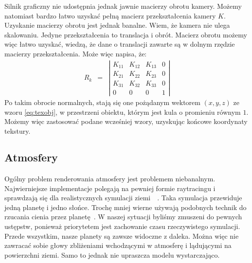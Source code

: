 Silnik graficzny nie udostępnia jednak jawnie macierzy obrotu kamery. Możemy natomiast bardzo łatwo uzyskać pełną macierz przekształcenia kamery $K$. Uzyskanie macierzy obrotu jest jednak banalne. Wiem, że kamera nie ulega skalowaniu. Jedyne przekształcenia to translacja i obrót. Macierz obrotu możemy więc łatwo uzyskać, wiedzą, że dane o translacji zawarte są w dolnym rzędzie macierzy przekształcenia. Może więc napisa, że:
\begin{eqnarray}
R_k &=&  
\left| \begin{array}{cccc}
K_{11} & K_{12} & K_{13} & 0 \\ 
K_{21} & K_{22} & K_{23} & 0 \\
K_{31} & K_{32} & K_{33} & 0 \\
0 & 0 & 0 & 1 
\end{array} \right|
\end{eqnarray}
Po takim obrocie normalnych, stają się one pożądanym wektorem $(x,y,z)$ ze wzoru \hyperref[eq:texobj]{\ref{eq:texobj}}, w przestrzeni obiektu, którym jest kula o promieniu równym $1$. Możemy więc zastosować podane wcześniej wzory, uzyskując końcowe koordynaty tekstury.

\subsection{Atmosfery}\label{sub:atmosfery}
\paragraph{}

Ogólny problem renderowania atmosfery jest problemem niebanalnym. Najwierniejsze implementacje polegają na pewniej formie raytracingu i sprawdzają się dla realistycznych symulacji ziemi~\cite{burneton:atmo}~\cite{gpugems:atmo}. Taka symulacja przewiduje jedną planetę i jedno słońce. Trochę mniej wierne używają podobnych technik do rzucania cienia przez planetę~\cite{josth:atmo}. W naszej sytuacji byliśmy zmuszeni do pewnych ustępstw, ponieważ priorytetem jest zachowanie czasu rzeczywistego symulacji. Przede wszystkim, nasze planety są zawsze widoczne z daleka. Można więc nie zawracać sobie głowy zbliżeniami wchodzącymi w atmosferę i lądującymi na powierzchni ziemi. Samo to jednak nie upraszcza modelu wystarczająco.

\paragraph{}

